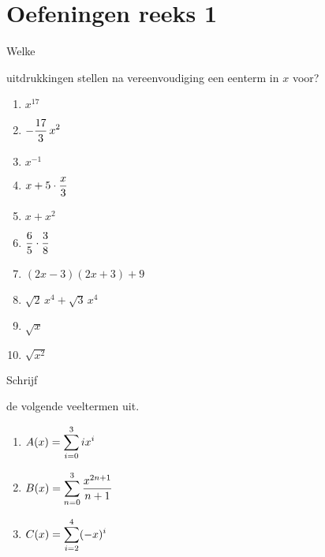 \documentclass{ximera}
\begin{document}
{}
\section*{Oefeningen reeks 1}

\begin{Oefening}\setcounter{enumi}{1} 
\hypertarget{oef1.1}{Welke} uitdrukkingen stellen na vereenvoudiging een eenterm in $x$ voor? 
\begin{multicols}{2}
\begin{enumerate}%
\item
$x^{17}$
\item
$\displaystyle -\frac{17}{3}\,x^2$
\item
$x^{-1}$
\item
$\displaystyle x + 5\cdot \frac{x}{3}$
\item
$x + x^2$
\item
$\displaystyle \frac{6}{5}\cdot\frac{3}{8}$
\item
$(2x-3)(2x+3)+9$
\item
$\sqrt{2}\,x^4 + \sqrt{3}\,x^4$
\item
$\sqrt{x}$
\item
$\sqrt{x^2}$
\end{enumerate}
\end{multicols}
\end{Oefening}

\begin{Oefening}\setcounter{enumi}{2}
\hypertarget{oef1.2}{Schrijf} de volgende veeltermen uit.
\begin{enumerate}%
\item
$\displaystyle A(x) = \sum_{i=0}^3 ix^i$
\item
$\displaystyle B(x) = \sum_{n=0}^3 \frac{x^{2n+1}}{n+1}$
\item
$\displaystyle C(x) = \sum_{i=2}^4 (-x)^i$
\end{enumerate}
\end{Oefening}
\end{document}
